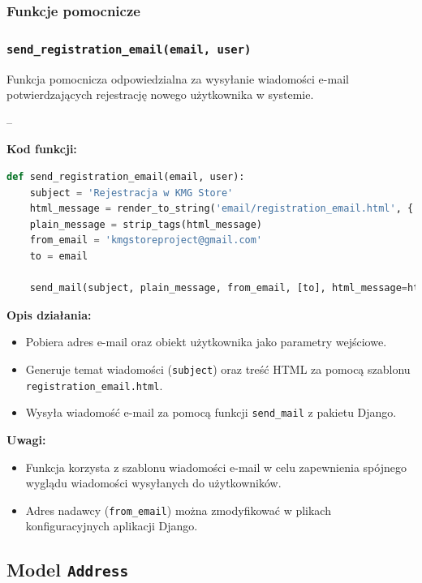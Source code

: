\documentclass[12pt,a4paper,oneside]{article}
\theoremstyle{definition}
\numberwithin{equation}{section}
\begin{document}
\subsubsection{Funkcje pomocnicze}
\label{sec:helper_functions}

\subsubsection*{\texttt{send\_registration\_email(email, user)}}
Funkcja pomocnicza odpowiedzialna za wysyłanie wiadomości e-mail potwierdzających rejestrację nowego użytkownika w systemie.

--

\textbf{Kod funkcji:}
\begin{lstlisting}[language=Python, caption=Funkcja \texttt{send\_registration_email}]
def send_registration_email(email, user):
    subject = 'Rejestracja w KMG Store'
    html_message = render_to_string('email/registration_email.html', {'user': user})
    plain_message = strip_tags(html_message)
    from_email = 'kmgstoreproject@gmail.com'
    to = email

    send_mail(subject, plain_message, from_email, [to], html_message=html_message)
\end{lstlisting}

\textbf{Opis działania:}
\begin{itemize}
    \item Pobiera adres e-mail oraz obiekt użytkownika jako parametry wejściowe.
    \item Generuje temat wiadomości (\texttt{subject}) oraz treść HTML za pomocą szablonu \texttt{registration\_email.html}.
    \item Wysyła wiadomość e-mail za pomocą funkcji \texttt{send\_mail} z pakietu Django.
\end{itemize}

\textbf{Uwagi:}
\begin{itemize}
    \item Funkcja korzysta z szablonu wiadomości e-mail w celu zapewnienia spójnego wyglądu wiadomości wysyłanych do użytkowników.
    \item Adres nadawcy (\texttt{from\_email}) można zmodyfikować w plikach konfiguracyjnych aplikacji Django.
\end{itemize}


%
%
\subsection{Model \texttt{Address}}
\end{document}
